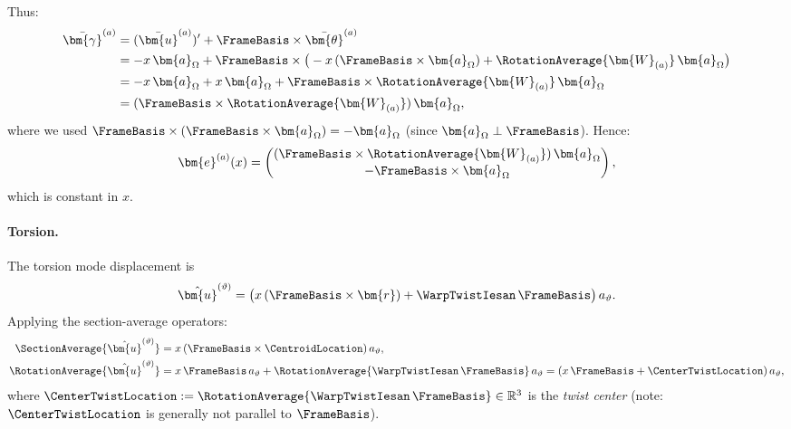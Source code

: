 Thus:
\begin{align*}
\bar{\bm{\gamma}}^{(a)} &= (\bar{\bm{u}}^{(a)})' + \FrameBasis \times \bar{\bm{\theta}}^{(a)} \\
&= -x\,\bm{a}_\Omega + \FrameBasis \times \big( -x\,(\FrameBasis \times \bm{a}_\Omega) + \RotationAverage{\bm{W}_{(a)}}\,\bm{a}_\Omega \big) \\
&= -x\,\bm{a}_\Omega + x\,\bm{a}_\Omega + \FrameBasis \times \RotationAverage{\bm{W}_{(a)}}\,\bm{a}_\Omega \\
&= (\FrameBasis \times \RotationAverage{\bm{W}_{(a)}})\,\bm{a}_\Omega,
\end{align*}
where we used $\FrameBasis \times (\FrameBasis \times \bm{a}_\Omega) = -\bm{a}_\Omega$ 
(since $\bm{a}_\Omega \perp \FrameBasis$). 
Hence:
\begin{equation*}
\bm{e}^{(a)}(x) = \begin{pmatrix} (\FrameBasis \times \RotationAverage{\bm{W}_{(a)}})\,\bm{a}_\Omega \\ 
-\FrameBasis \times \bm{a}_\Omega \end{pmatrix},
\end{equation*}
which is constant in $x$.

\paragraph{Torsion.}

The torsion mode displacement is
\begin{equation*}
\hat{\bm{u}}^{(\vartheta)} = \big( x\,(\FrameBasis \times \bm{r}) + \WarpTwistIesan\,\FrameBasis \big)\,a_\vartheta.
\end{equation*}
Applying the section-average operators:
\begin{align*}
\SectionAverage{\hat{\bm{u}}^{(\vartheta)}} &= x\,(\FrameBasis \times \CentroidLocation)\,a_\vartheta, \\
\RotationAverage{\hat{\bm{u}}^{(\vartheta)}} &= x\,\FrameBasis\,a_\vartheta + \RotationAverage{\WarpTwistIesan\,\FrameBasis}\,a_\vartheta 
= (x\,\FrameBasis + \CenterTwistLocation)\,a_\vartheta,
\end{align*}
where $\CenterTwistLocation := \RotationAverage{\WarpTwistIesan\,\FrameBasis} \in \mathbb{R}^3$ 
is the \emph{twist center} (note: $\CenterTwistLocation$ is generally not parallel to $\FrameBasis$).

